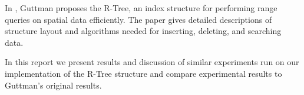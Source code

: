 In \cite{DBLP:conf/sigmod/Guttman84}, Guttman proposes the R-Tree, an index structure for performing range queries on spatial data efficiently. The paper gives detailed descriptions of structure layout and algorithms needed for inserting, deleting, and searching data. 

In this report we present results and discussion of similar experiments run on our implementation of the R-Tree structure and compare experimental results to Guttman's original results.  